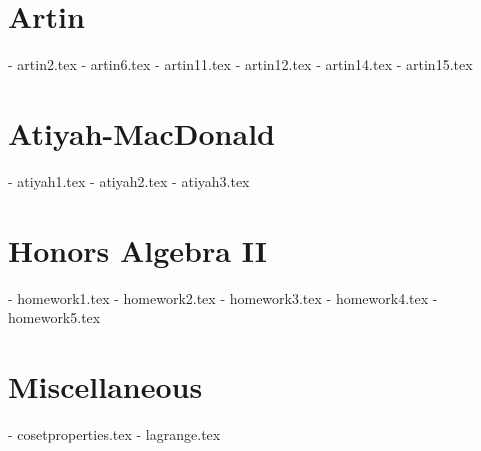 \section{Artin}
- artin2.tex     %
- artin6.tex     %
- artin11.tex     %
- artin12.tex     %
- artin14.tex     %
- artin15.tex     %

\section{Atiyah-MacDonald}
- atiyah1.tex     %
- atiyah2.tex     %
- atiyah3.tex     %

\section{Honors Algebra II}
- homework1.tex
- homework2.tex
- homework3.tex
- homework4.tex
- homework5.tex

\section{Miscellaneous}
- cosetproperties.tex     %
- lagrange.tex     %
